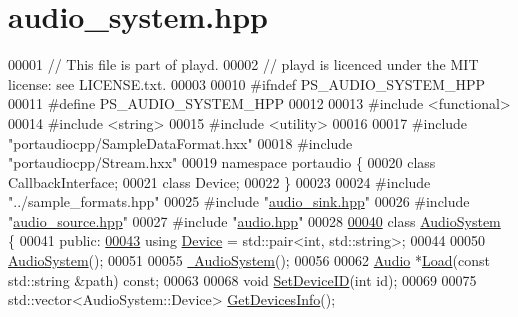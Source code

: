 \hypertarget{audio__system_8hpp_source}{\section{audio\+\_\+system.\+hpp}
\label{audio__system_8hpp_source}
}

\begin{DoxyCode}
00001 \textcolor{comment}{// This file is part of playd.}
00002 \textcolor{comment}{// playd is licenced under the MIT license: see LICENSE.txt.}
00003 
00010 \textcolor{preprocessor}{#ifndef PS\_AUDIO\_SYSTEM\_HPP}
00011 \textcolor{preprocessor}{#define PS\_AUDIO\_SYSTEM\_HPP}
00012 
00013 \textcolor{preprocessor}{#include <functional>}
00014 \textcolor{preprocessor}{#include <string>}
00015 \textcolor{preprocessor}{#include <utility>}
00016 
00017 \textcolor{preprocessor}{#include "portaudiocpp/SampleDataFormat.hxx"}
00018 \textcolor{preprocessor}{#include "portaudiocpp/Stream.hxx"}
00019 \textcolor{keyword}{namespace }portaudio \{
00020 \textcolor{keyword}{class }CallbackInterface;
00021 \textcolor{keyword}{class }Device;
00022 \}
00023 
00024 \textcolor{preprocessor}{#include "../sample\_formats.hpp"}
00025 \textcolor{preprocessor}{#include "\hyperlink{audio__sink_8hpp}{audio\_sink.hpp}"}
00026 \textcolor{preprocessor}{#include "\hyperlink{audio__source_8hpp}{audio\_source.hpp}"}
00027 \textcolor{preprocessor}{#include "\hyperlink{audio_8hpp}{audio.hpp}"}
00028 
\hypertarget{audio__system_8hpp_source_l00040}{}\hyperlink{classAudioSystem}{00040} \textcolor{keyword}{class }\hyperlink{classAudioSystem}{AudioSystem} \{
00041 \textcolor{keyword}{public}:
\hypertarget{audio__system_8hpp_source_l00043}{}\hyperlink{classAudioSystem_a33bfa767bca10a6ce71e72708c586c67}{00043}     \textcolor{keyword}{using} \hyperlink{classAudioSystem_a33bfa767bca10a6ce71e72708c586c67}{Device} = std::pair<int, std::string>;
00044 
00050     \hyperlink{classAudioSystem_ad17cde8deff07ef7d7d56be62df98739}{AudioSystem}();
00051 
00055     \hyperlink{classAudioSystem_a9ad830040ea5f68a6a63957c6f281055}{~AudioSystem}();
00056 
00062     \hyperlink{classAudio}{Audio} *\hyperlink{classAudioSystem_a2172608177d2bd54377bfc3c61cd117d}{Load}(\textcolor{keyword}{const} std::string &path) \textcolor{keyword}{const};
00063 
00068     \textcolor{keywordtype}{void} \hyperlink{classAudioSystem_ade3b400828991d02e36a0b61302d30d2}{SetDeviceID}(\textcolor{keywordtype}{int} \textcolor{keywordtype}{id});
00069 
00075     std::vector<AudioSystem::Device> \hyperlink{classAudioSystem_aa268faeb9243c18588631024958856e6}{GetDevicesInfo}();

\end{DoxyCode}

